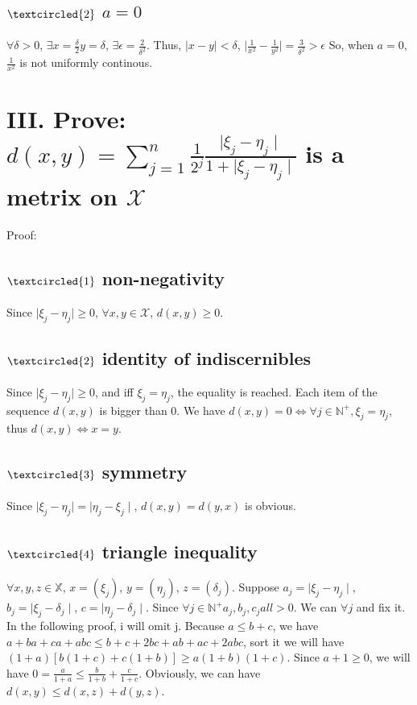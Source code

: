 \documentclass[twoside,a4paper]{article}
\begin{document}
\subsection*{\small{$\textcircled{2}$ $a=0$}}

$\forall \delta > 0$, $\exists x=\frac{\delta}{2} y=\delta$, $\exists \epsilon = \frac{2}{\delta^2}$.
Thus, $\mid x - y \mid < \delta$, $\mid \frac{1}{x^2} - \frac{1}{y^2} \mid = \frac{3}{\delta^2} > \epsilon$
So, when $a = 0$, $\frac{1}{x^2}$ is not uniformly continous.

\section*{III. \small{Prove: $d(x,y) = \sum_{j=1}^{n}\frac{1}{2^j}\frac{\mid\xi_{j} - \eta_{j}\mid}{1 + \mid\xi_{j} - \eta_{j}\mid}$ is a metrix on $\mathcal{X}$}}
Proof:

\subsection*{\small{$\textcircled{1}$ non-negativity}}

Since $\mid\xi_{j} - \eta_{j}\mid \geq 0$, $\forall x,y \in \mathcal{X}$, $d(x,y) \geq 0$.

\subsection*{\small{$\textcircled{2}$ identity of indiscernibles}} 

Since $\mid\xi_{j} - \eta_{j}\mid \geq 0$, and iff $\xi_{j} = \eta_{j}$, the equality is reached. Each item of the sequence $d(x,y)$ is bigger than 0.
We have $d(x,y) = 0 \iff \forall j \in \mathbb{N}^+, \xi_{j} = \eta_{j}$, thus $d(x,y) \iff x = y$. 

\subsection*{\small{$\textcircled{3}$ symmetry}}

Since $\mid\xi_{j} - \eta_{j}\mid = \mid\eta_{j} - \xi_{j}\mid$, $d(x,y) = d(y,x)$ is obvious.

\subsection*{\small{$\textcircled{4}$ triangle inequality}}

$\forall x,y,z \in \mathbb{X}$, $x = (\xi_{j})$, $y = (\eta_{j})$, $z = (\delta_{j})$.
Suppose $a_{j} = \mid\xi_{j} - \eta_{j}\mid$, $b_{j} = \mid\xi_{j}- \delta_{j}\mid$, $c = \mid\eta_{j} - \delta_{j}\mid$.
Since $\forall j \in \mathbb{N}^+ a_{j}, b_{j}, c_{j} all > 0$. We can $\forall j$ and fix it. In the following proof, i will omit j.
Because $a \leq b + c$, we have $a + ba + ca + abc \leq b + c + 2bc + ab + ac + 2abc$, sort it we will have $(1 + a)[b(1 + c) + c(1 + b)] \geq a(1 + b)(1 + c)$.
Since $a + 1 \geq 0$, we will have $0 = \frac{a}{1 + a} \leq \frac{b}{1 + b} + \frac{c}{1 + c}$. Obviously, we can have $d(x,y) \leq d(x,z) + d(y,z)$.
\end{document}
